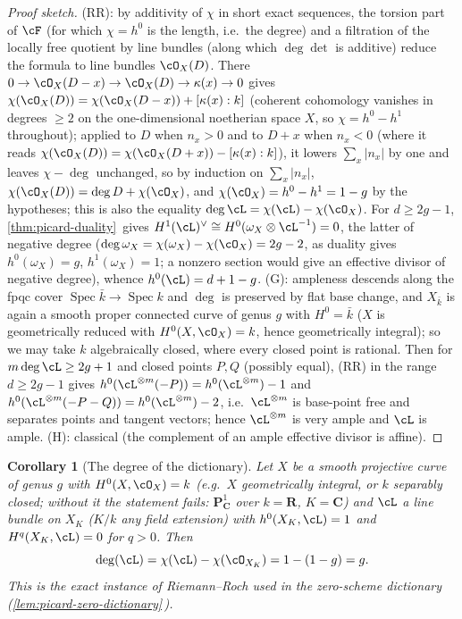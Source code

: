 \documentclass[11pt]{article}
\theoremstyle{plain}
\newtheorem{corollary}[theorem]{Corollary}
\theoremstyle{definition}
\DeclareMathOperator{\Spec}{Spec}
\newcommand{\Cref}[1]{\hyperref[#1]{\ref{#1}}\,\hyperref[#1]{\nameref*{#1}}}
\begin{document}
\begin{proof}[Proof sketch]
(RR): by additivity of $\chi$ in short exact sequences, the torsion
part of $\cF$ (for which $\chi=h^0$ is the length, i.e.\ the degree) and a
filtration of the locally free quotient by line bundles (along which
$\deg\det$ is additive) reduce the formula to
line bundles $\cO_X(D)$.  There $0\to\cO_X(D-x)\to\cO_X(D)\to\kappa(x)\to0$
gives $\chi(\cO_X(D))=\chi(\cO_X(D-x))+[\kappa(x):k]$ (coherent
cohomology vanishes in degrees $\ge2$ on the one-dimensional noetherian
space $X$, so $\chi=h^0-h^1$ throughout); applied to $D$ when $n_x>0$
and to $D+x$ when $n_x<0$ (where it reads
$\chi(\cO_X(D))=\chi(\cO_X(D+x))-[\kappa(x):k]$), it lowers
$\sum_x|n_x|$ by one and leaves $\chi-\deg$ unchanged, so by induction on
$\sum_x|n_x|$, $\chi(\cO_X(D))=\deg D+\chi(\cO_X)$, and
$\chi(\cO_X)=h^0-h^1=1-g$ by the hypotheses; this is also the equality
$\deg\cL=\chi(\cL)-\chi(\cO_X)$.  For $d\ge2g-1$,
\Cref{thm:picard-duality} gives
$H^1(\cL)^\vee\cong H^0(\omega_X\otimes\cL^{-1})=0$, the latter of
negative degree ($\deg\omega_X=\chi(\omega_X)-\chi(\cO_X)=2g-2$, as
duality gives $h^0(\omega_X)=g$, $h^1(\omega_X)=1$; a nonzero section
would give an effective divisor of negative degree), whence $h^0(\cL)=d+1-g$.  (G): ampleness descends along the
fpqc cover $\Spec\bar k\to\Spec k$ and $\deg$ is preserved by flat
base change, and $X_{\bar k}$ is again a smooth proper connected curve
of genus $g$ with $H^0=\bar k$ ($X$ is geometrically reduced with
$H^0(X,\cO_X)=k$, hence geometrically integral); so we may take $k$
algebraically closed, where every closed point is rational.  Then for
$m\deg\cL\ge2g+1$ and closed points $P,Q$ (possibly equal), (RR) in
the range $d\ge2g-1$ gives
$h^0(\cL^{\otimes m}(-P))=h^0(\cL^{\otimes m})-1$ and
$h^0(\cL^{\otimes m}(-P-Q))=h^0(\cL^{\otimes m})-2$, i.e.\
$\cL^{\otimes m}$ is base-point free and separates points and tangent
vectors; hence $\cL^{\otimes m}$ is very ample and $\cL$ is ample.
(H): classical (the complement of an
ample effective divisor is affine).
\end{proof}

\begin{corollary}[The degree of the dictionary]
\label{cor:picard-degree-g}
Let $X$ be a smooth projective curve of genus $g$ with
$H^0(X,\cO_X)=k$ (e.g.\ $X$ geometrically integral, or $k$ separably
closed; without it the statement fails: $\mathbf P^1_{\mathbf C}$ over
$k=\mathbf R$, $K=\mathbf C$) and $\cL$ a line
bundle on $X_K$ ($K/k$ any field extension) with $h^0(X_K,\cL)=1$
and $H^q(X_K,\cL)=0$ for $q>0$.  Then
\[
\deg(\cL)=\chi(\cL)-\chi(\cO_{X_K})=1-(1-g)=g.
\]
This is the exact instance of Riemann--Roch used in the
zero-scheme dictionary (\Cref{lem:picard-zero-dictionary}).
\end{corollary}
\end{document}
